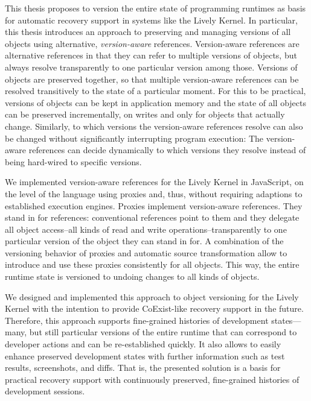 This thesis proposes to version the entire state of programming runtimes as basis for automatic recovery support in systems like the Lively Kernel.
In particular, this thesis introduces an approach to preserving and managing versions of all objects using alternative, \emph{version-aware} references.
Version-aware references are alternative references in that they can refer to multiple versions of objects, but always resolve transparently to one particular version among those.
Versions of objects are preserved together, so that multiple version-aware references can be resolved transitively to the state of a particular moment.
For this to be practical, versions of objects can be kept in application memory and the state of all objects can be preserved incrementally, on writes and only for objects that actually change.
Similarly, to which versions the version-aware references resolve can also be changed without significantly interrupting program execution:
The version-aware references can decide dynamically to which versions they resolve instead of being hard-wired to specific versions.

We implemented version-aware references for the Lively Kernel in JavaScript, on the level of the language using proxies and, thus, without requiring adaptions to established execution engines.
Proxies implement version-aware references.
They stand in for references: conventional references point to them and they delegate all object access--all kinds of read and write operations--transparently to one particular version of the object they can stand in for.
A combination of the versioning behavior of proxies and automatic source transformation allow to introduce and use these proxies consistently for all objects.
This way, the entire runtime state is versioned to undoing changes to all kinds of objects.

We designed and implemented this approach to object versioning for the Lively Kernel with the intention to provide CoExist-like recovery support in the future.
Therefore, this approach supports fine-grained histories of development states---many, but still particular versions of the entire runtime that can correspond to developer actions and can be re-established quickly.
It also allows to easily enhance preserved development states with further information such as test results, screenshots, and diffs.
That is, the presented solution is a basis for practical recovery support with continuously preserved, fine-grained histories of development sessions.

